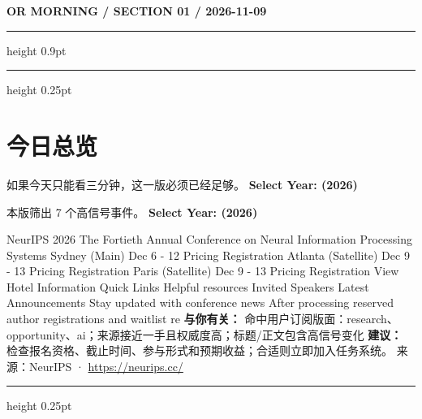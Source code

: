 \documentclass[10.5pt]{ctexart}
\begin{document}
{\small\bfseries OR MORNING / SECTION 01 / 2026-11-09}
\vspace{2mm}
\hrule height 0.9pt
\vspace{1.5mm}
\hrule height 0.25pt
\vspace{4mm}
\section*{今日总览}
{\color{ormuted} 如果今天只能看三分钟，这一版必须已经足够。}
\vspace{2mm}
{\fontsize{25}{29}\selectfont\bfseries Select Year: (2026)}\par
\vspace{2mm}
{\large 本版筛出 7 个高信号事件。}
\vspace{3mm}
{\Large\bfseries Select Year: (2026)}\par
NeurIPS 2026 The Fortieth Annual Conference on Neural Information Processing Systems Sydney (Main) Dec 6 - 12 Pricing Registration Atlanta (Satellite) Dec 9 - 13 Pricing Registration Paris (Satellite) Dec 9 - 13 Pricing Registration View Hotel Information Quick Links Helpful resources Invited Speakers Latest Announcements Stay updated with conference news After processing reserved author registrations and waitlist re
\textbf{与你有关：} 命中用户订阅版面：research、opportunity、ai；来源接近一手且权威度高；标题/正文包含高信号变化
\textbf{建议：} 检查报名资格、截止时间、参与形式和预期收益；合适则立即加入任务系统。
{\footnotesize\color{ormuted} 来源：NeurIPS · \url{https://neurips.cc/}}
\vspace{3mm}
\hrule height 0.25pt
\vspace{3mm}
\end{document}
